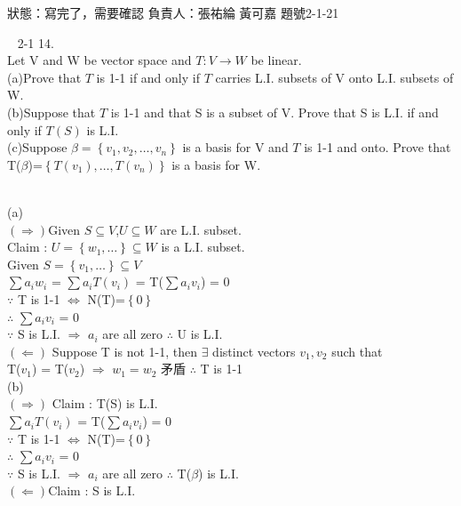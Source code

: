 \documentclass
[answers]
{exam}
\begin{document}
\begin{questions}
\begin{solution}
\end{solution}
    \begin{tcolorbox}
    狀態：寫完了，需要確認  負責人：張祐綸  黃可嘉    題號2-1-21
    \end{tcolorbox}
    \question \
2-1 14.
\\Let V and W be vector space and $T:V\rightarrow W$ be linear.
\\(a)Prove that $T$ is 1-1 if and  only if $T$ carries L.I. subsets of V onto L.I. subsets of W.
\\(b)Suppose that $T$ is 1-1 and that S is a subset of V.	Prove that S is L.I. if and only if $T(S)$ is L.I.
\\(c)Suppose $\beta =\left\{ v_{1},v_{2},\ldots ,v_{n}\right\} $ is a basis for V and $T$ is 1-1 and onto.	Prove that T($\beta$)=$\left\{ T\left( v_{1}\right) ,\ldots ,T\left( v_{n}\right) \right\} $ is a basis for W.
\begin{solution}
\\(a)
\\$( \Rightarrow  ) $Given $S\subseteq V$,$U\subseteq W$ are L.I. subset.
\\Claim : $U=\left\{ w_{1},\ldots \right\} \subseteq W$ is a L.I. subset.
\\Given $S=\left\{v_{1},\ldots \right\} \subseteq V$
\\$\sum a_{i}w_{i}$ = $\sum a_{i}T(v_{i})$ = T($\sum a_{i}v_{i}$) = 0
\\$\because$ T is 1-1 $\Leftrightarrow $ N(T)=$\left\{0\right\}$
\\$\therefore$ $\sum a_{i}v_{i}$ = 0
\\$\because$ S is L.I. $\Rightarrow$ $a_{i}$ are all zero $\therefore$ U is L.I.
\\$( \Leftarrow  ) $ Suppose T is not 1-1, then $\exists$ distinct vectors $v_{1},v_{2}$ such that 
\\T($v_{1}$) = T($v_{2}$) $\Rightarrow$ $w_{1}=w_{2}$ 矛盾 $\therefore$ T is 1-1
\\(b)
\\$( \Rightarrow  ) $ Claim : T(S) is L.I.
\\$\sum a_{i}T(v_{i})$ = T($\sum a_{i}v_{i}$) = 0
\\$\because$ T is 1-1 $\Leftrightarrow $ N(T)=$\left\{0\right\}$
\\$\therefore$ $\sum a_{i}v_{i}$ = 0
\\$\because$ S is L.I. $\Rightarrow$ $a_{i}$ are all zero $\therefore$ T($\beta$) is L.I.
\\$(  \Leftarrow  )$Claim : S is L.I.

\end{solution}
\end{questions}
\end{document}
